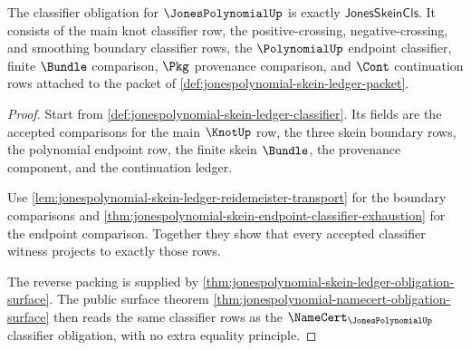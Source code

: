 \begin{theorem}
\label{thm:jonespolynomial-classifier-obligation}
The classifier obligation for $\JonesPolynomialUp$ is exactly
$\mathsf{JonesSkeinCls}$. It consists of the main knot classifier row, the
positive-crossing, negative-crossing, and smoothing boundary classifier rows,
the $\PolynomialUp$ endpoint classifier, finite $\Bundle$ comparison,
$\Pkg$ provenance comparison, and $\Cont$ continuation rows attached to the
packet of \autoref{def:jonespolynomial-skein-ledger-packet}.
\end{theorem}
\begin{proof}
Start from \autoref{def:jonespolynomial-skein-ledger-classifier}. Its fields are
the accepted comparisons for the main $\KnotUp$ row, the three skein boundary
rows, the polynomial endpoint row, the finite skein $\Bundle$, the provenance
component, and the continuation ledger.

Use \autoref{lem:jonespolynomial-skein-ledger-reidemeister-transport} for the
boundary comparisons and
\autoref{thm:jonespolynomial-skein-endpoint-classifier-exhaustion} for the
endpoint comparison. Together they show that every accepted classifier witness
projects to exactly those rows.

The reverse packing is supplied by
\autoref{thm:jonespolynomial-skein-ledger-obligation-surface}. The public
surface theorem \autoref{thm:jonespolynomial-namecert-obligation-surface} then
reads the same classifier rows as the $\NameCert_{\JonesPolynomialUp}$
classifier obligation, with no extra equality principle.
\end{proof}

